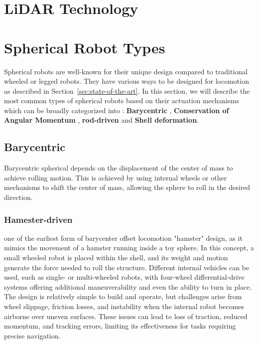 \documentclass[english, bachelor, utf8]{base/thesis_telematics}
\begin{document}
\section{LiDAR Technology}

\section{Spherical Robot Types}
\label{sec:spherical-robot-types}
Spherical robots are well-known for their unique design compared to traditional wheeled or legged robots.
They have various ways to be designed for locomotion as described in Section~\ref{sec:state-of-the-art}.
In this section, we will describe the most common types of spherical robots based on their actuation mechanisms which can be broadly categorized into : \textbf{Barycentric} , \textbf{Conservation of Angular Momentum} , \textbf{rod-driven} and \textbf{Shell deformation}.
\subsection{Barycentric}
Barycentric spherical depends on the displacement of the center of mass to achieve rolling motion.
This is achieved by using internal wheels or other mechanisms to shift the center of mass, allowing the sphere to roll in the desired direction.~\cite{Aminata}
\subsubsection{Hamester-driven}
one of the earliest form of barycenter offset locomotion "hamster" design, as it mimics the movement of a hamster running inside a toy sphere. 
In this concept, a small wheeled robot is placed within the shell, and its weight and motion generate the force needed to roll the structure. Different internal vehicles can be used, such as single- or multi-wheeled robots, with four-wheel differential-drive systems offering additional maneuverability and even the ability to turn in place. 
The design is relatively simple to build and operate, but challenges arise from wheel slippage, friction losses, and instability when the internal robot becomes airborne over uneven surfaces. 
These issues can lead to loss of traction, reduced momentum, and tracking errors, limiting its effectiveness for tasks requiring precise navigation.~\cite{flywheel_hamaster_explanation}
\end{document}
